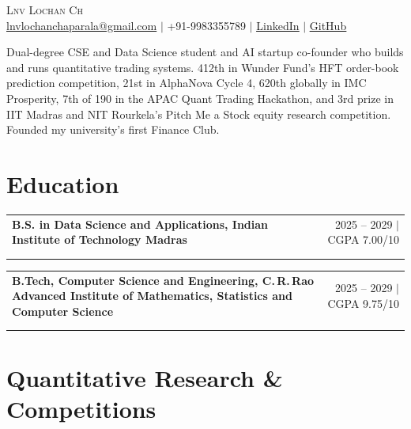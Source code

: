 \documentclass[letterpaper,10pt]{article}
\makeatletter
\newcommand{\entry}[4]{%
  \vspace{2pt}
  \begin{tabularx}{\linewidth}{@{}X@{\hspace{6pt}}r@{}}
    \textbf{#1} & #2 \\
    \if\relax\detokenize{#3}\relax\else \textit{\small #3} & \textit{\small #4} \\ \fi
  \end{tabularx}\vspace{-3pt}
}
\makeatother
\begin{document}
\begin{center}
  {\Huge \scshape Lnv Lochan Ch} \\[3pt]
  \small
  \href{mailto:lnvlochanchaparala@gmail.com}{lnvlochanchaparala@gmail.com} $|$
  +91-9983355789 $|$
  \href{https://www.linkedin.com/in/lnv-lochan-ch-7b43ab379/}{\underline{LinkedIn}} $|$
  \href{https://github.com/Lnvqntx}{\underline{GitHub}}
\end{center}
\vspace{-6pt}

\small
Dual-degree CSE and Data Science student and AI startup co-founder who builds and runs quantitative trading systems.
412th in Wunder Fund's HFT order-book prediction competition, 21st in AlphaNova Cycle 4,
620th globally in IMC Prosperity, 7th of 190 in the APAC Quant Trading Hackathon, and 3rd prize in IIT Madras
and NIT Rourkela's Pitch Me a Stock equity research competition. Founded my university's first Finance Club.
\normalsize

\section{Education}
\entry{B.S. in Data Science and Applications, Indian Institute of Technology Madras}{2025 -- 2029 $|$ CGPA 7.00/10}{}{}
\entry{B.Tech, Computer Science and Engineering, C.\,R.\,Rao Advanced Institute of Mathematics, Statistics and Computer Science}{2025 -- 2029 $|$ CGPA 9.75/10}{}{}

\section{Quantitative Research \& Competitions}
\end{document}
